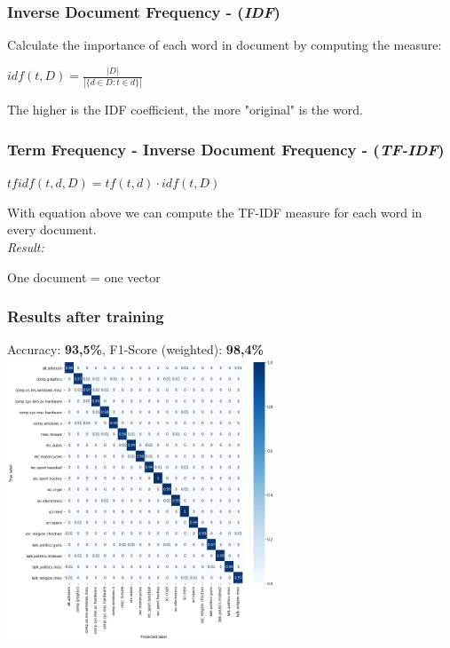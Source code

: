 \documentclass{beamer}
\begin{document}
    \begin{frame}
        \frametitle{Inverse Document Frequency - (\textit{IDF})}
        Calculate the importance of each word in document by computing the measure:
        \begin{center}
            $idf(t, D) = \frac{ |D| }{ | \{ d \in D : t \in d \} | } $
        \end{center}
        The higher is the IDF coefficient, the more "original" is the word.
    \end{frame}
    \begin{frame}
        \frametitle{Term Frequency - Inverse Document Frequency - (\textit{TF-IDF})}
        \begin{center}
            $tfidf(t, d, D) = tf(t, d) \cdot idf(t, D)$
        \end{center}
        With equation above we can compute the TF-IDF measure for each word in every document. \\
        \textit{Result:}
        \begin{center}
            One document = one vector
        \end{center}
    \end{frame}
    \begin{frame}
    	\frametitle{Results after training}
        \centering
        Accuracy: \textbf{93,5\%}, F1-Score (weighted): \textbf{98,4\%}
        \includegraphics[width=0.6\textwidth]{tfidf_matrix.png}
    \end{frame}
\end{document}
